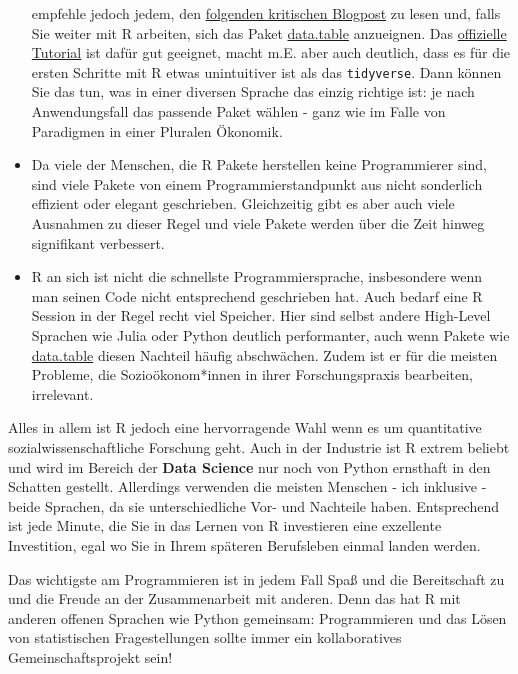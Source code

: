 \documentclass[]{book}
\begin{document}
\begin{itemize}
{    empfehle jedoch jedem, den
    \href{https://github.com/matloff/TidyverseSkeptic}{folgenden
    kritischen Blogpost} zu lesen und, falls Sie weiter mit R arbeiten,
    sich das Paket
    \href{https://rdatatable.gitlab.io/data.table/}{data.table}
    anzueignen. Das
    \href{https://cran.r-project.org/web/packages/data.table/vignettes/datatable-intro.html}{offizielle
    Tutorial} ist dafür gut geeignet, macht m.E. aber auch deutlich,
    dass es für die ersten Schritte mit R etwas unintuitiver ist als das
    \texttt{tidyverse}. Dann können Sie das tun, was in einer diversen
    Sprache das einzig richtige ist: je nach Anwendungsfall das passende
    Paket wählen - ganz wie im Falle von Paradigmen in einer Pluralen
    Ökonomik.}
\item
  Da viele der Menschen, die R Pakete herstellen keine Programmierer
  sind, sind viele Pakete von einem Programmierstandpunkt aus nicht
  sonderlich effizient oder elegant geschrieben. Gleichzeitig gibt es
  aber auch viele Ausnahmen zu dieser Regel und viele Pakete werden über
  die Zeit hinweg signifikant verbessert.
\item
  R an sich ist nicht die schnellste Programmiersprache, insbesondere
  wenn man seinen Code nicht entsprechend geschrieben hat. Auch bedarf
  eine R Session in der Regel recht viel Speicher. Hier sind selbst
  andere High-Level Sprachen wie Julia oder Python deutlich
  performanter, auch wenn Pakete wie
  \href{https://rdatatable.gitlab.io/data.table/}{data.table} diesen
  Nachteil häufig abschwächen. Zudem ist er für die meisten Probleme,
  die Sozioökonom*innen in ihrer Forschungspraxis bearbeiten,
  irrelevant.
\end{itemize}

Alles in allem ist R jedoch eine hervorragende Wahl wenn es um
quantitative sozialwissenschaftliche Forschung geht. Auch in der
Industrie ist R extrem beliebt und wird im Bereich der \textbf{Data
Science} nur noch von Python ernsthaft in den Schatten gestellt.
Allerdings verwenden die meisten Menschen - ich inklusive - beide
Sprachen, da sie unterschiedliche Vor- und Nachteile haben. Entsprechend
ist jede Minute, die Sie in das Lernen von R investieren eine exzellente
Investition, egal wo Sie in Ihrem späteren Berufsleben einmal landen
werden.

Das wichtigste am Programmieren ist in jedem Fall Spaß und die
Bereitschaft zu und die Freude an der Zusammenarbeit mit anderen. Denn
das hat R mit anderen offenen Sprachen wie Python gemeinsam:
Programmieren und das Lösen von statistischen Fragestellungen sollte
immer ein kollaboratives Gemeinschaftsprojekt sein!
\end{document}
